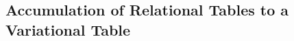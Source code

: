 \subsection{Accumulation of Relational Tables to a Variational Table}
\label{sec:accum}




\begin{example}
\label{eg:acc-table-from-conf}
\end{example}

\begin{example}
\label{eg:acc-table-from-group}
\end{example}